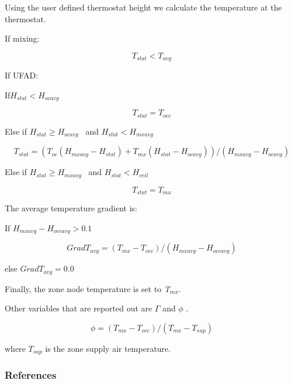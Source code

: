 Using the user defined thermostat height we calculate the temperature at the thermostat.

If mixing:

\begin{equation}
{T_{stat}} < {T_{avg}}
\end{equation}

If UFAD:

If\({H_{stat}} < {H_{ocavg}}\)

\begin{equation}
{T_{stat}} = {T_{occ}}
\end{equation}

Else if \({H_{stat}} \ge {H_{ocavg}}\) ~and \({H_{stat}} < {H_{mxavg}}\)

\begin{equation}
{T_{stat}} = \left( {{T_{oc}}\left( {{H_{mxavg}} - {H_{stat}}} \right) + {T_{mx}}\left( {{H_{stat}} - {H_{ocavg}}} \right)} \right)/\left( {{H_{mxavg}} - {H_{ocavg}}} \right)
\end{equation}

Else if \({H_{stat}} \ge {H_{mxavg}}\) ~and \({H_{stat}} < {H_{ceil}}\)

\begin{equation}
{T_{stat}} = {T_{mx}}
\end{equation}

The average temperature gradient is:

If \({H_{mxavg}} - {H_{occavg}} > 0.1\)

\begin{equation}
Grad{T_{avg}} = ({T_{mx}} - {T_{occ}})/({H_{mxavg}} - {H_{occavg}})
\end{equation}

else \(Grad{T_{avg}} = 0.0\)

Finally, the zone node temperature is set to \emph{T\(_{mx}\)}.

Other variables that are reported out are \(\Gamma\) and \(\phi\) .

\begin{equation}
\phi  = ({T_{mx}} - {T_{occ}})/({T_{mx}} - {T_{sup}})
\end{equation}

where \({T_{sup}}\) is the zone supply air temperature.

\subsubsection{References}\label{references-3-000}


